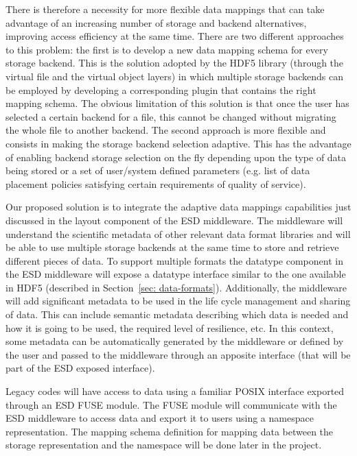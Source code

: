There is therefore a necessity for more flexible data mappings that can take advantage of an increasing number of storage and backend alternatives, improving access efficiency at the same time. There are two different approaches to this problem: the first is to develop a new data mapping schema for every storage backend. This is the solution adopted by the HDF5 library (through the virtual file and the virtual object layers) in which multiple storage backends can be employed by developing a corresponding plugin that contains the right mapping schema. The obvious limitation of this solution is that once the user has selected a certain backend for a file, this cannot be changed without migrating the whole file to another backend. The second approach is more flexible and consists in making the storage backend selection adaptive. This has the advantage of enabling backend storage selection on the fly depending upon the type of data being stored or a set of user/system defined parameters (e.g. list of data placement policies satisfying certain requirements of quality of service).

Our proposed solution is to integrate the adaptive data mappings capabilities just discussed in the layout component of the ESD middleware. The middleware will understand the scientific metadata of other relevant data format libraries and will be able to use multiple storage backends at the same time to store and retrieve different pieces of data. To support multiple formats the datatype component in the ESD middleware will expose a datatype interface similar to the one available in HDF5 (described in Section~\ref{sec: data-formats}). Additionally, the middleware will add significant metadata to be used in the life cycle management and sharing of data. This can include semantic metadata describing which data is needed and how it is going to be used, the required level of resilience, etc. In this context, some metadata can be automatically generated by the middleware or defined by the user and passed to the middleware through an apposite interface (that will be part of the ESD exposed interface).

Legacy codes will have access to data using a familiar POSIX interface exported through an ESD FUSE module. The FUSE module will communicate with the ESD middleware to access data and export it to users using a namespace representation. The mapping schema definition for mapping data between the storage representation and the namespace will be done later in the project.

